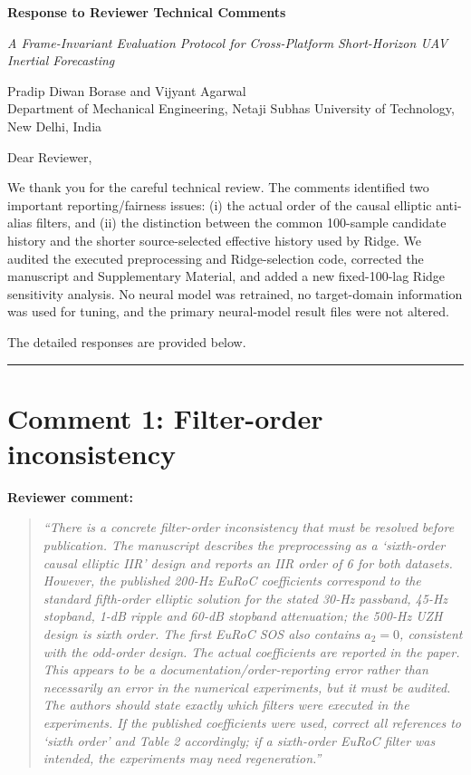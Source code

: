 \documentclass[12pt,a4paper]{article}
\begin{document}
\begin{center}
{\LARGE\bfseries Response to Reviewer Technical Comments}

\vspace{0.7em}
{\large\itshape A Frame-Invariant Evaluation Protocol for Cross-Platform Short-Horizon UAV Inertial Forecasting}

\vspace{0.4em}
Pradip Diwan Borase and Vijyant Agarwal\\
Department of Mechanical Engineering, Netaji Subhas University of Technology, New Delhi, India
\end{center}

\bigskip

Dear Reviewer,

\medskip

We thank you for the careful technical review. The comments identified two important reporting/fairness issues: (i) the actual order of the causal elliptic anti-alias filters, and (ii) the distinction between the common 100-sample candidate history and the shorter source-selected effective history used by Ridge. We audited the executed preprocessing and Ridge-selection code, corrected the manuscript and Supplementary Material, and added a new fixed-100-lag Ridge sensitivity analysis. No neural model was retrained, no target-domain information was used for tuning, and the primary neural-model result files were not altered.

The detailed responses are provided below.

\bigskip
\hrule
\bigskip

\section*{Comment 1: Filter-order inconsistency}

\noindent
\textbf{Reviewer comment:}

\begin{quote}
\itshape
``There is a concrete filter-order inconsistency that must be resolved before publication. The manuscript describes the preprocessing as a `sixth-order causal elliptic IIR' design and reports an IIR order of 6 for both datasets. However, the published 200-Hz EuRoC coefficients correspond to the standard fifth-order elliptic solution for the stated 30-Hz passband, 45-Hz stopband, 1-dB ripple and 60-dB stopband attenuation; the 500-Hz UZH design is sixth order. The first EuRoC SOS also contains $a_2=0$, consistent with the odd-order design. The actual coefficients are reported in the paper. This appears to be a documentation/order-reporting error rather than necessarily an error in the numerical experiments, but it must be audited. The authors should state exactly which filters were executed in the experiments. If the published coefficients were used, correct all references to `sixth order' and Table 2 accordingly; if a sixth-order EuRoC filter was intended, the experiments may need regeneration.''
\end{quote}
\end{document}
